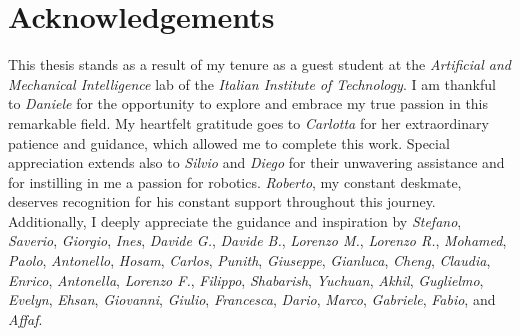 \documentclass{Configuration_Files/PoliMi3i_thesis}
\begin{document}
\listoffigures

\listoftables


\chapter*{Acknowledgements}

This thesis stands as a result of my tenure as a guest student at the \textit{Artificial and Mechanical Intelligence} lab of the \textit{Italian Institute of Technology}. I am thankful to \textit{Daniele} for the opportunity to explore and embrace my true passion in this remarkable field. My heartfelt gratitude goes to \textit{Carlotta} for her extraordinary patience and guidance, which allowed me to complete this work. Special appreciation extends also to \textit{Silvio} and \textit{Diego} for their unwavering assistance and for instilling in me a passion for robotics. \textit{Roberto}, my constant deskmate, deserves recognition for his constant support throughout this journey. Additionally, I deeply appreciate the guidance and inspiration by \textit{Stefano}, \textit{Saverio}, \textit{Giorgio}, \textit{Ines}, \textit{Davide G.}, \textit{Davide B.}, \textit{Lorenzo M.}, \textit{Lorenzo R.}, \textit{Mohamed}, \textit{Paolo}, \textit{Antonello}, \textit{Hosam}, \textit{Carlos}, \textit{Punith}, \textit{Giuseppe}, \textit{Gianluca}, \textit{Cheng}, \textit{Claudia}, \textit{Enrico}, \textit{Antonella}, \textit{Lorenzo F.}, \textit{Filippo}, \textit{Shabarish}, \textit{Yuchuan}, \textit{Akhil}, \textit{Guglielmo}, \textit{Evelyn}, \textit{Ehsan}, \textit{Giovanni}, \textit{Giulio}, \textit{Francesca}, \textit{Dario}, \textit{Marco}, \textit{Gabriele}, \textit{Fabio}, and \textit{Affaf}.
\end{document}

